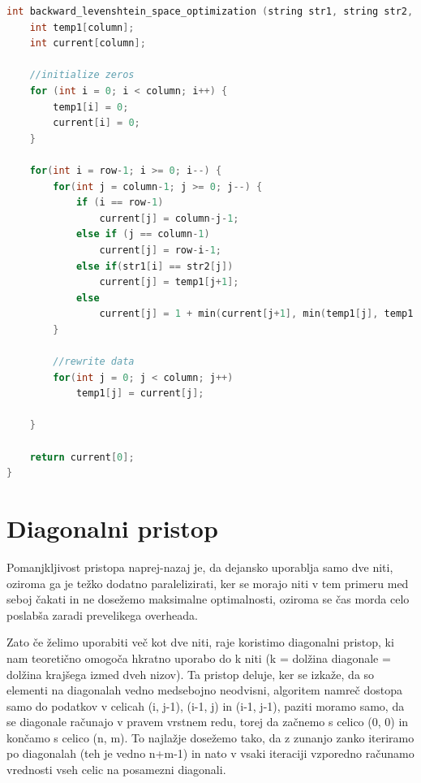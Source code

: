 \documentclass[a4paper,12pt,openright]{book}
\begin{document}
\begin{lstlisting}[language=C++, caption={Prostorska optimizacija}, captionpos=b, label=spaceOptimization]
int backward_levenshtein_space_optimization (string str1, string str2, int row, int column) {
    int temp1[column]; 
    int current[column];

    //initialize zeros
    for (int i = 0; i < column; i++) {
        temp1[i] = 0;
        current[i] = 0;
    }

    for(int i = row-1; i >= 0; i--) {
        for(int j = column-1; j >= 0; j--) {
            if (i == row-1)
                current[j] = column-j-1;
            else if (j == column-1)
                current[j] = row-i-1;
            else if(str1[i] == str2[j])
                current[j] = temp1[j+1];
            else
                current[j] = 1 + min(current[j+1], min(temp1[j], temp1[j+1]));
        }

        //rewrite data
        for(int j = 0; j < column; j++) 
            temp1[j] = current[j];

    }

    return current[0];
}
\end{lstlisting}

\section{Diagonalni pristop}

Pomanjkljivost pristopa naprej-nazaj je, da dejansko uporablja samo dve niti, oziroma ga je težko dodatno paralelizirati, ker se morajo niti v tem primeru med seboj čakati in ne dosežemo maksimalne optimalnosti, oziroma se čas morda celo poslabša zaradi prevelikega overheada. 

Zato če želimo uporabiti več kot dve niti, raje koristimo diagonalni pristop, ki nam teoretično omogoča hkratno uporabo do k niti (k = dolžina diagonale = dolžina krajšega izmed dveh nizov). Ta pristop deluje, ker se izkaže, da so elementi na diagonalah vedno medsebojno neodvisni, algoritem namreč dostopa samo do podatkov v celicah (i, j-1), (i-1, j) in (i-1, j-1), paziti moramo samo, da se diagonale računajo v pravem vrstnem redu, torej da začnemo s celico (0, 0) in končamo s celico (n, m). To najlažje dosežemo tako, da z zunanjo zanko iteriramo po diagonalah (teh je vedno n+m-1) in nato v vsaki iteraciji vzporedno računamo vrednosti vseh celic na posamezni diagonali. 
\end{document}
